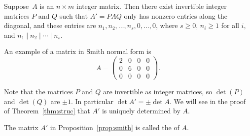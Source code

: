 \begin{proposition}
  \label{prop:smith}
  Suppose~$A$ is an $n\times m$ integer matrix.  Then there exist
  invertible integer matrices $P$ and $Q$ such that $A'=PAQ$ only
  has nonzero entries along the diagonal, and these entries are
  $n_1, n_2,\dots, n_s,0,\dots,0$, where
  $s\geq 0$, $n_i\geq 1$ for all $i$, and $n_1\mid n_2 \mid \cdots \mid n_s$.
\end{proposition}

\begin{example}
  An example of a matrix in Smith normal form is
  \[
    A = \begin{pmatrix}
    2 & 0 & 0 & 0 \\
    0 & 6 & 0 & 0 \\
    0 & 0 & 0 & 0
    \end{pmatrix}.
  \]
\end{example}

\begin{remark}
  Note that the matrices $P$ and $Q$ are invertible as integer
  matrices, so $\det(P)$ and $\det(Q)$ are $\pm 1$. In particular
  $\det A' = \pm\det A$. We will see in the proof of Theorem~\ref{thm:struc} that
  $A'$ is uniquely determined by $A$.
\end{remark}

\begin{definition}
  The matrix $A'$ in Proposition~\ref{prop:smith}
  is called the  of $A$.
\end{definition}

